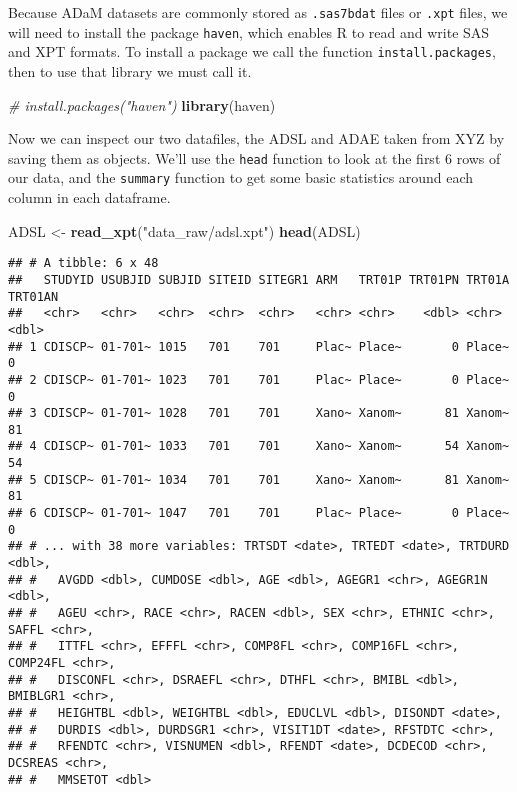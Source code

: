 \documentclass[]{book}
\newenvironment{Shaded}{\begin{snugshade}}{\end{snugshade}}
\newcommand{\CommentTok}[1]{\textcolor[rgb]{0.56,0.35,0.01}{\textit{#1}}}
\newcommand{\KeywordTok}[1]{\textcolor[rgb]{0.13,0.29,0.53}{\textbf{#1}}}
\newcommand{\NormalTok}[1]{#1}
\newcommand{\StringTok}[1]{\textcolor[rgb]{0.31,0.60,0.02}{#1}}
\begin{document}
Because ADaM datasets are commonly stored as \texttt{.sas7bdat} files or \texttt{.xpt} files, we will need to install the package \texttt{haven}, which enables R to read and write SAS and XPT formats. To install a package we call the function \texttt{install.packages}, then to use that library we must call it.

\begin{Shaded}
\begin{Highlighting}[]
\CommentTok{# install.packages("haven")}
\KeywordTok{library}\NormalTok{(haven)}
\end{Highlighting}
\end{Shaded}

Now we can inspect our two datafiles, the ADSL and ADAE taken from XYZ by saving them as objects. We'll use the \texttt{head} function to look at the first 6 rows of our data, and the \texttt{summary} function to get some basic statistics around each column in each dataframe.

\begin{Shaded}
\begin{Highlighting}[]
\NormalTok{ADSL <-}\StringTok{ }\KeywordTok{read_xpt}\NormalTok{(}\StringTok{"data_raw/adsl.xpt"}\NormalTok{)}
\KeywordTok{head}\NormalTok{(ADSL)}
\end{Highlighting}
\end{Shaded}

\begin{verbatim}
## # A tibble: 6 x 48
##   STUDYID USUBJID SUBJID SITEID SITEGR1 ARM   TRT01P TRT01PN TRT01A TRT01AN
##   <chr>   <chr>   <chr>  <chr>  <chr>   <chr> <chr>    <dbl> <chr>    <dbl>
## 1 CDISCP~ 01-701~ 1015   701    701     Plac~ Place~       0 Place~       0
## 2 CDISCP~ 01-701~ 1023   701    701     Plac~ Place~       0 Place~       0
## 3 CDISCP~ 01-701~ 1028   701    701     Xano~ Xanom~      81 Xanom~      81
## 4 CDISCP~ 01-701~ 1033   701    701     Xano~ Xanom~      54 Xanom~      54
## 5 CDISCP~ 01-701~ 1034   701    701     Xano~ Xanom~      81 Xanom~      81
## 6 CDISCP~ 01-701~ 1047   701    701     Plac~ Place~       0 Place~       0
## # ... with 38 more variables: TRTSDT <date>, TRTEDT <date>, TRTDURD <dbl>,
## #   AVGDD <dbl>, CUMDOSE <dbl>, AGE <dbl>, AGEGR1 <chr>, AGEGR1N <dbl>,
## #   AGEU <chr>, RACE <chr>, RACEN <dbl>, SEX <chr>, ETHNIC <chr>, SAFFL <chr>,
## #   ITTFL <chr>, EFFFL <chr>, COMP8FL <chr>, COMP16FL <chr>, COMP24FL <chr>,
## #   DISCONFL <chr>, DSRAEFL <chr>, DTHFL <chr>, BMIBL <dbl>, BMIBLGR1 <chr>,
## #   HEIGHTBL <dbl>, WEIGHTBL <dbl>, EDUCLVL <dbl>, DISONDT <date>,
## #   DURDIS <dbl>, DURDSGR1 <chr>, VISIT1DT <date>, RFSTDTC <chr>,
## #   RFENDTC <chr>, VISNUMEN <dbl>, RFENDT <date>, DCDECOD <chr>, DCSREAS <chr>,
## #   MMSETOT <dbl>
\end{verbatim}
\end{document}

